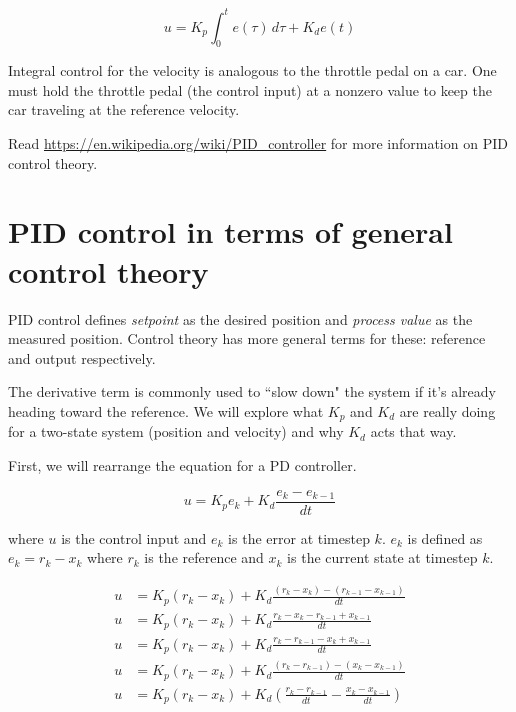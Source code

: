 \begin{theorem}
  \begin{equation}
    u = K_p \int_0^t e(\tau) \,d\tau + K_d e(t)
  \end{equation}
\end{theorem}

Integral control for the velocity is analogous to the throttle pedal on a car.
One must hold the throttle pedal (the control input) at a nonzero value to keep
the car traveling at the reference velocity.

Read \url{https://en.wikipedia.org/wiki/PID_controller} for more information on
PID control theory.

\section{PID control in terms of general control theory}

PID control defines \textit{setpoint} as the desired position and
\textit{process value} as the measured position. Control theory has more general
terms for these: \gls{reference} and \gls{output} respectively.

The derivative term is commonly used to ``slow down" the system if it's already
heading toward the \gls{reference}. We will explore what $K_p$ and $K_d$ are
really doing for a two-state system (position and velocity) and why $K_d$ acts
that way.

First, we will rearrange the equation for a PD controller.

\begin{equation*}
  u = K_p e_k + K_d \frac{e_k - e_{k-1}}{dt}
\end{equation*}

where $u$ is the control input and $e_k$ is the error at timestep $k$. $e_k$ is
defined as $e_k = r_k - x_k$ where $r_k$ is the reference and $x_k$ is the
current state at timestep $k$.

\begin{align*}
  u &= K_p (r_k - x_k) + K_d \frac{(r_k - x_k) - (r_{k-1} - x_{k-1})}{dt} \\
  u &= K_p (r_k - x_k) + K_d \frac{r_k - x_k - r_{k-1} + x_{k-1}}{dt} \\
  u &= K_p (r_k - x_k) + K_d \frac{r_k - r_{k-1} - x_k + x_{k-1}}{dt} \\
  u &= K_p (r_k - x_k) + K_d \frac{(r_k - r_{k-1}) - (x_k - x_{k-1})}{dt} \\
  u &= K_p (r_k - x_k) + K_d \left(\frac{r_k - r_{k-1}}{dt} -
    \frac{x_k - x_{k-1}}{dt}\right)
\end{align*}

